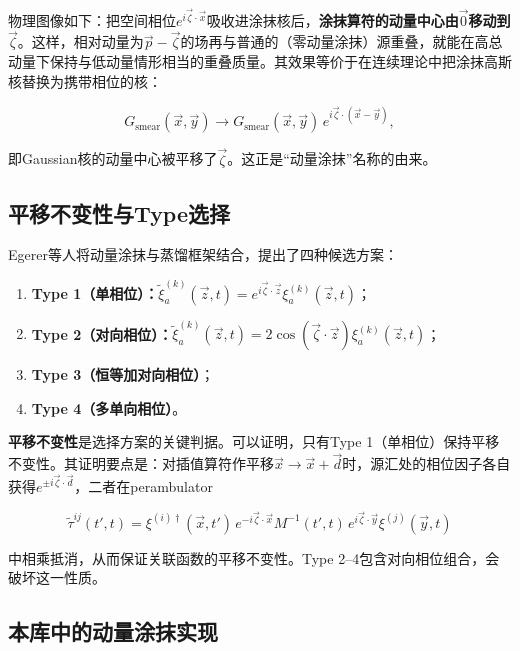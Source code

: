 \documentclass[12pt,a4paper]{ctexart}
\theoremstyle{definition}
\begin{document}
物理图像如下：把空间相位$e^{i\vec{\zeta}\cdot\vec{x}}$吸收进涂抹核后，\textbf{涂抹算符的动量中心由$\vec{0}$移动到$\vec{\zeta}$}。这样，相对动量为$\vec{p}-\vec{\zeta}$的场再与普通的（零动量涂抹）源重叠，就能在高总动量下保持与低动量情形相当的重叠质量。其效果等价于在连续理论中把涂抹高斯核替换为携带相位的核：

\begin{equation}
G_{\text{smear}}(\vec{x},\vec{y}) \longrightarrow G_{\text{smear}}(\vec{x},\vec{y})\, e^{i\vec{\zeta}\cdot(\vec{x}-\vec{y})},
\label{eq:phase_kernel}
\end{equation}

即Gaussian核的动量中心被平移了$\vec{\zeta}$。这正是``动量涂抹''名称的由来。

\subsection{平移不变性与Type选择}

Egerer等人将动量涂抹与蒸馏框架结合，提出了四种候选方案\cite{Egerer2021a}：

\begin{enumerate}
    \item \textbf{Type 1（单相位）：}$\tilde\xi^{(k)}_a(\vec{z}, t) = e^{i\vec{\zeta}\cdot\vec{z}} \xi^{(k)}_a(\vec{z}, t)$；
    \item \textbf{Type 2（对向相位）：}$\tilde\xi^{(k)}_a(\vec{z}, t) = 2\cos(\vec{\zeta}\cdot\vec{z}) \xi^{(k)}_a(\vec{z}, t)$；
    \item \textbf{Type 3（恒等加对向相位）}；
    \item \textbf{Type 4（多单向相位）}。
\end{enumerate}

\textbf{平移不变性}是选择方案的关键判据。可以证明，只有Type 1（单相位）保持平移不变性\cite{Egerer2021a}。其证明要点是：对插值算符作平移$\vec{x} \to \vec{x}+\vec{d}$时，源汇处的相位因子各自获得$e^{\pm i\vec{\zeta}\cdot\vec{d}}$，二者在perambulator

\begin{equation}
\tilde\tau^{ij}(t', t) = \xi^{(i)\dagger}(\vec{x}, t')\, e^{-i\vec{\zeta}\cdot\vec{x}} M^{-1}(t', t)\, e^{i\vec{\zeta}\cdot\vec{y}} \xi^{(j)}(\vec{y}, t)
\label{eq:translation_invariance}
\end{equation}

中相乘抵消，从而保证关联函数的平移不变性。Type 2–4包含对向相位组合，会破坏这一性质。

\subsection{本库中的动量涂抹实现}
\end{document}
